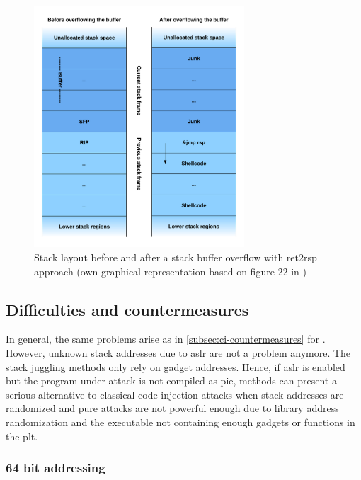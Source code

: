 \begin{figure}[htb]
	\centering
	\includegraphics[width=0.7\textwidth]{figures/ret2rsp}
	\caption{Stack layout before and after a stack buffer overflow with ret2rsp approach (own graphical representation based on figure 22 in \cite[13]{Mueller2008})}
	\label{fig:ret2rsp}
\end{figure}

\subsection{Difficulties and countermeasures}
\label{subsec:aici-countermeasures}

In general, the same problems arise as in \cref{subsec:ci-countermeasures} for .
However, unknown stack addresses due to \gls{aslr} are not a problem anymore.
The stack juggling methods only rely on gadget addresses.
Hence, if \gls{aslr} is enabled but the program under attack is not compiled as \gls{pie},  methods can present a serious alternative to classical code injection attacks when stack addresses are randomized and pure  attacks are not powerful enough due to library address randomization and the executable not containing enough gadgets or functions in the \gls{plt}.

\subsubsection{64 bit addressing}
\label{subsubsec:aici-64bit-addressing}


